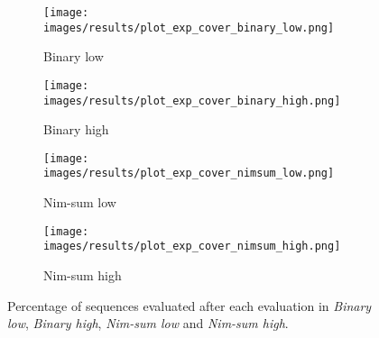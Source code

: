 

\begin{figure}[ht]
	\begin{subfigure}{0.49\linewidth}
	\centering
	\texttt{[image: images/results/plot\_exp\_cover\_binary\_low.png]}
	\caption{Binary low}
	\label{fig:exp_cover_binary_low}
	\end{subfigure}
	\hfill
	\begin{subfigure}{0.49\linewidth}
	\centering
	\texttt{[image: images/results/plot\_exp\_cover\_binary\_high.png]}
	\caption{Binary high}
	\label{fig:exp_cover_binary_high}
	\end{subfigure}
	\begin{subfigure}{0.49\linewidth}
	\centering
	\texttt{[image: images/results/plot\_exp\_cover\_nimsum\_low.png]}
	\caption{Nim-sum low}
	\label{fig:exp_cover_nimsum_low}
	\end{subfigure}
	\hfill
	\begin{subfigure}{0.49\linewidth}
	\centering
	\texttt{[image: images/results/plot\_exp\_cover\_nimsum\_high.png]}
	\caption{Nim-sum high}
	\label{fig:exp_cover_nimsum_high}
	\end{subfigure}
	\caption[Percentage sequences evaluated in Binary and Nim-sum]{Percentage of sequences evaluated after each evaluation in
	\emph{Binary low}, \emph{Binary high}, \emph{Nim-sum low} and \emph{Nim-sum
	high}.}
	\label{fig:exp_cover2}
\end{figure}
